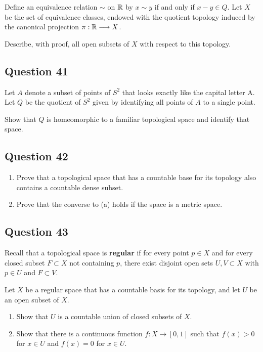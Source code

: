 \documentclass[12pt]{article}
\begin{document}
Define an equivalence relation \(\sim\) on \({\mathbb{R}}\) by \(x \sim y\) if
and only if \(x - y \in Q\). Let \(X\) be the set of equivalence
classes, endowed with the quotient topology induced by the canonical
projection \(\pi : {\mathbb{R}} \longrightarrow X\).

Describe, with proof, all open subsets of \(X\) with respect to this
topology.

\hypertarget{question-41-3}{%
\subsection{Question 41}\label{question-41-3}}

Let \(A\) denote a subset of points of \(S^2\) that looks exactly like
the capital letter A. Let \(Q\) be the quotient of \(S^2\) given by
identifying all points of \(A\) to a single point.

Show that \(Q\) is homeomorphic to a familiar topological space and
identify that space.

\hypertarget{question-42-3}{%
\subsection{Question 42}\label{question-42-3}}

\begin{enumerate}
\def\labelenumi{\alph{enumi}.}
\item
  Prove that a topological space that has a countable base for its
  topology also contains a countable dense subset.
\item
  Prove that the converse to (a) holds if the space is a metric space.
\end{enumerate}

\hypertarget{question-43-3}{%
\subsection{Question 43}\label{question-43-3}}

Recall that a topological space is \textbf{regular} if for every point
\(p \in X\) and for every closed subset \(F \subset X\) not containing
\(p\), there exist disjoint open sets \(U, V \subset X\) with
\(p \in U\) and \(F \subset V\).

Let \(X\) be a regular space that has a countable basis for its
topology, and let \(U\) be an open subset of \(X\).

\begin{enumerate}
\def\labelenumi{\alph{enumi}.}
\item
  Show that \(U\) is a countable union of closed subsets of \(X\).
\item
  Show that there is a continuous function \(f : X \to [0,1]\) such that
  \(f (x) > 0\) for \(x \in U\) and \(f (x) = 0\) for \(x \in U\).
\end{enumerate}
\end{document}
